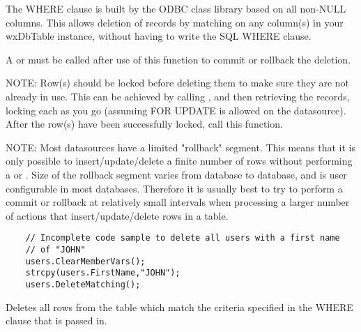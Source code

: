 The WHERE clause is built by the ODBC class library based on all non-NULL 
columns.  This allows deletion of records 
by matching on any column(s) in your wxDbTable instance, without having to 
write the SQL WHERE clause.

A  or 
 must be called after use of 
this function to commit or rollback the deletion.

NOTE: Row(s) should be locked before deleting them to make sure they are 
not already in use.  This can be achieved by calling , 
and then retrieving the records, locking each as you go (assuming FOR UPDATE 
is allowed on the datasource).  After the row(s) have been successfully locked, 
call this function.

NOTE: Most datasources have a limited "rollback" segment.  This means 
that it is only possible to insert/update/delete a finite number of rows 
without performing a  or 
.  Size of the rollback 
segment varies from database to database, and is user configurable in 
most databases.  Therefore it is usually best to try to perform a commit 
or rollback at relatively small intervals when processing a larger number 
of actions that insert/update/delete rows in a table.



\begin{verbatim}
    // Incomplete code sample to delete all users with a first name
    // of "JOHN"
    users.ClearMemberVars();
    strcpy(users.FirstName,"JOHN");
    users.DeleteMatching();
\end{verbatim}


\label{wxdbtabledeletewhere}


Deletes all rows from the table which match the criteria specified in the 
WHERE clause that is passed in.



